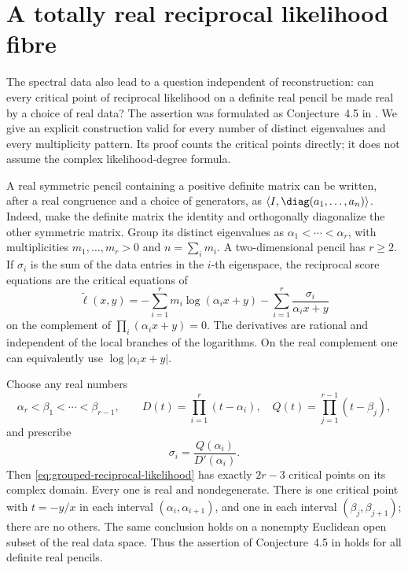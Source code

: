 \section{A totally real reciprocal likelihood fibre}
\label{sec:totally-real-likelihood}

The spectral data also lead to a question independent of reconstruction:
can every critical point of reciprocal likelihood on a definite real
pencil be made real by a choice of real data?  The assertion was
formulated as Conjecture~4.5 in
\cite{FevolaMandelshtamSturmfels}.  We give an explicit construction
valid for every number of distinct eigenvalues and every
multiplicity pattern.  Its proof counts the critical points directly;
it does not assume the complex likelihood-degree formula.

A real symmetric pencil containing a positive definite matrix can be
written, after a real congruence and a choice of generators, as
\(\langle I,\diag(a_1,\ldots,a_n)\rangle\).  Indeed, make the
definite matrix the identity and orthogonally diagonalize the other
symmetric matrix.  Group its distinct eigenvalues as
\(\alpha_1<\cdots<\alpha_r\), with multiplicities
\(m_1,\ldots,m_r>0\) and \(n=\sum_i m_i\).  A two-dimensional
pencil has \(r\ge2\).  If \(\sigma_i\) is the sum of the data
entries in the \(i\)-th eigenspace, the reciprocal score equations
are the critical equations of
\begin{equation}\label{eq:grouped-reciprocal-likelihood}
 \widetilde\ell(x,y)
 =-\sum_{i=1}^r m_i\log(\alpha_i x+y)
       -\sum_{i=1}^r\frac{\sigma_i}{\alpha_i x+y}
\end{equation}
on the complement of \(\prod_i(\alpha_i x+y)=0\).
The derivatives are rational and independent of the local branches
of the logarithms.  On the real complement one can equivalently
use \(\log|\alpha_i x+y|\).

\begin{theorem}
\label{thm:totally-real-reciprocal-likelihood}
Choose any real numbers
\[
 \alpha_r<\beta_1<\cdots<\beta_{r-1},
 \qquad
 D(t)=\prod_{i=1}^r(t-\alpha_i),\quad
 Q(t)=\prod_{j=1}^{r-1}(t-\beta_j),
\]
and prescribe
\begin{equation}\label{eq:explicit-real-likelihood-data}
                       \sigma_i=\frac{Q(\alpha_i)}{D'(\alpha_i)}.
\end{equation}
Then \eqref{eq:grouped-reciprocal-likelihood} has exactly
\(2r-3\) critical points on its complex domain.  Every one is
real and nondegenerate.  There is one critical point with
\(t=-y/x\) in each interval
\((\alpha_i,\alpha_{i+1})\), and one in each interval
\((\beta_j,\beta_{j+1})\); there are no others.
The same conclusion holds on a nonempty Euclidean open subset of
the real data space.  Thus the assertion of Conjecture~4.5 in
\cite{FevolaMandelshtamSturmfels} holds for all definite real pencils.
\end{theorem}


